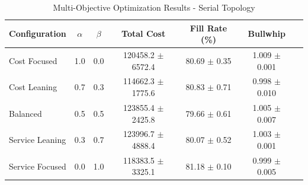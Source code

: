 \begin{table}[htbp]
\centering
\caption{Multi-Objective Optimization Results - Serial Topology}
\label{tab:pareto_serial}
\begin{tabular}{lcccccc}
\toprule
Configuration & $\alpha$ & $\beta$ & Total Cost & Fill Rate (\%) & Bullwhip \\
\midrule
Cost Focused & 1.0 & 0.0 & 120458.2 $\pm$ 6572.4 & 80.69 $\pm$ 0.35 & 1.009 $\pm$ 0.001 \\
Cost Leaning & 0.7 & 0.3 & 114662.3 $\pm$ 1775.6 & 80.83 $\pm$ 0.71 & 0.998 $\pm$ 0.010 \\
Balanced & 0.5 & 0.5 & 123855.4 $\pm$ 2425.8 & 79.66 $\pm$ 0.61 & 1.005 $\pm$ 0.007 \\
Service Leaning & 0.3 & 0.7 & 123996.7 $\pm$ 4888.4 & 80.07 $\pm$ 0.52 & 1.003 $\pm$ 0.001 \\
Service Focused & 0.0 & 1.0 & 118383.5 $\pm$ 3325.1 & 81.18 $\pm$ 0.10 & 0.999 $\pm$ 0.005 \\
\bottomrule
\end{tabular}
\end{table}